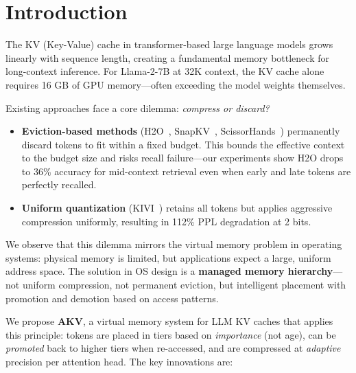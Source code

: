 \documentclass[11pt,a4paper]{article}
\begin{document}
\section{Introduction}

The KV (Key-Value) cache in transformer-based large language models grows linearly with sequence length, creating a fundamental memory bottleneck for long-context inference. For Llama-2-7B at 32K context, the KV cache alone requires 16 GB of GPU memory---often exceeding the model weights themselves.

Existing approaches face a core dilemma: \textit{compress or discard?}

\begin{itemize}
    \item \textbf{Eviction-based methods} (H2O~\cite{h2o}, SnapKV~\cite{snapkv}, ScissorHands~\cite{scissorhands}) permanently discard tokens to fit within a fixed budget. This bounds the effective context to the budget size and risks recall failure---our experiments show H2O drops to 36\% accuracy for mid-context retrieval even when early and late tokens are perfectly recalled.
    \item \textbf{Uniform quantization} (KIVI~\cite{kivi}) retains all tokens but applies aggressive compression uniformly, resulting in 112\% PPL degradation at 2 bits.
\end{itemize}

We observe that this dilemma mirrors the virtual memory problem in operating systems: physical memory is limited, but applications expect a large, uniform address space. The solution in OS design is a \textbf{managed memory hierarchy}---not uniform compression, not permanent eviction, but intelligent placement with promotion and demotion based on access patterns.

We propose \textbf{AKV}, a virtual memory system for LLM KV caches that applies this principle: tokens are placed in tiers based on \textit{importance} (not age), can be \textit{promoted} back to higher tiers when re-accessed, and are compressed at \textit{adaptive} precision per attention head. The key innovations are:
\end{document}
